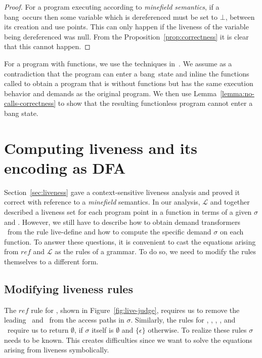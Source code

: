 \documentclass[9pt]{sigplanconf}
\newcommand{\bang}{\mbox{\sc bang}}
\begin{document}
\begin{proof}
For a program  executing according to {\em minefield  semantics}, if a
\bang\ occurs then some variable which is  dereferenced must be
set to  $\bot$, between its  creation and  use points.  This  can only
happen if  the liveness of  the variable being dereferenced  was null.
From  the Proposition~\ref{prop:correctness}  it  is clear  that this  cannot
happen.
\end{proof}

For   a    program   with   functions,   we    use   the   techniques
in~\cite{asati14lgc}. We  assume as  a contradiction that  the program
can enter a \bang\ state  and inline the  functions called to  obtain a
program that is without functions  but has the same execution behavior
and    demands    as   the    original    program.     We   then    use
Lemma~\ref{lemma:no-calls-correctness}  to  show  that  the  resulting
functionless program cannot enter a bang state.


\section{Computing liveness and its encoding as DFA}\label{sec:computing}
Section~\ref{sec:liveness} gave a  context-sensitive liveness analysis
and proved it  correct with reference to a  {\em minefield} semantics.
In  our  analysis, $\mathcal{L}$  and    together described  a
liveness set for each program point in  a function in terms of a given
$\sigma$  and \Lfonly.   However, we  still  have to  describe how  to
obtain demand  transformers \Lfonly\  from the rule  {\sc live-define}
and how to compute the specific demand $\sigma$ on each function.
To  answer these  questions, it  is convenient  to cast  the equations
arising from  $\mathit{ref}$ and  $\mathcal{L}$ as  the rules  of a
grammar.   To do  so, we  need  to modify  the rules  themselves to  a
different form.

\subsection{Modifying liveness rules}

The      $\mathit{ref}$     rule      for     \CONS,      shown     in
Figure~\ref{fig:live-judge},  requires   us  to  remove   the  leading
\acar\ and \acdr\  from the access paths in  $\sigma$.  Similarly, the
rules for  \CAR, \CDR, \PRIM, \NULLQ,  and \SIF\ require  us to return
$\emptyset$, if  $\sigma$ itself is $\emptyset$ and
$\lbrace\epsilon\rbrace$ otherwise.  To  realize these rules
$\sigma$ needs to be known. This creates difficulties since we want to
solve the equations arising from liveness symbolically.
\end{document}
